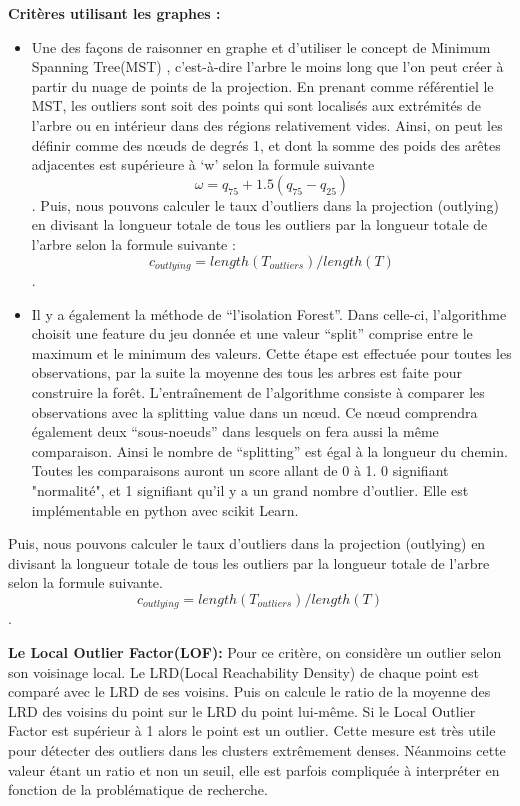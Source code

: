 \textbf{Critères utilisant les graphes :}
\begin{itemize}
    \item Une des façons de raisonner en graphe et d'utiliser le concept de Minimum Spanning Tree(MST) \cite{wilkinson2005graph-MST} , c'est-à-dire l'arbre le moins long que l'on peut créer à partir du nuage de points de la projection. 
    En prenant comme référentiel le MST, les outliers sont soit des points qui sont localisés aux extrémités de l’arbre ou en intérieur dans des régions relativement vides. Ainsi, on peut les définir comme des nœuds de degrés 1, et dont la somme des poids des arêtes adjacentes est supérieure à ‘w’ selon la formule suivante  \[ \omega = q_{75} + 1.5 (q_{75} - q_{25} ) \].
    Puis, nous pouvons calculer le taux d’outliers dans la projection (outlying) en divisant la longueur totale de tous les outliers par la longueur totale de l’arbre selon la formule suivante : \[c_{outlying} = length(T_{outliers} )/length(T) \] .
    \item Il y a également la méthode de “l’isolation Forest”. Dans celle-ci, l’algorithme choisit une feature du jeu donnée et une valeur “split” comprise entre le maximum et le minimum des valeurs. Cette étape est effectuée pour toutes les observations, par la suite la moyenne des tous les arbres est faite pour construire la forêt. L'entraînement de l’algorithme consiste à comparer les observations avec la splitting value dans un nœud. Ce nœud comprendra également deux “sous-noeuds” dans lesquels on fera aussi la même comparaison. Ainsi le nombre de “splitting” est égal à la longueur du chemin. Toutes les comparaisons auront un score allant de 0 à 1. 0 signifiant "normalité", et 1 signifiant qu’il y a un grand nombre d’outlier\cite{togbe2020anomaly-IsolationForest}. Elle est implémentable en python avec scikit Learn.
\end{itemize} 

Puis, nous pouvons calculer le taux d’outliers dans la projection (outlying) en divisant la
longueur totale de tous les outliers par la longueur totale de l’arbre selon la formule suivante.
\[c_{outlying} = length(T_{outliers} )/length(T) \].

\smallskip

\textbf{Le Local Outlier Factor(LOF):}
\smallskip
Pour ce critère, on considère un outlier selon son voisinage local\cite{breunig2000lof}.
Le LRD(Local Reachability Density) de chaque point est comparé avec le LRD de ses voisins. Puis on calcule le ratio de la moyenne des LRD des voisins du point sur le LRD du point lui-même. Si le Local Outlier Factor est supérieur à 1 alors le point est un outlier.
Cette mesure est très utile pour détecter des outliers dans les clusters extrêmement denses. Néanmoins cette valeur étant un ratio et non un seuil, elle est parfois compliquée à interpréter en fonction de la problématique de recherche.


